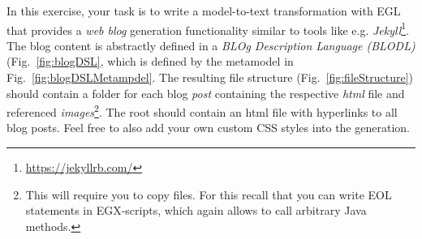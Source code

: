 \documentclass{article}
\begin{document}
	In this exercise, your task is to write a model-to-text transformation with EGL that provides a \emph{web blog} generation functionality similar to tools like e.g. \emph{Jekyll}\footnote{\url{https://jekyllrb.com/}}.
	The blog content is abstractly defined in a \emph{BLOg Description Language (BLODL)} (Fig.~\ref{fig:blogDSL}, which is defined by the metamodel in Fig.~\ref{fig:blogDSLMetampdel}.
	The resulting file structure (Fig.~\ref{fig:fileStructure}) should contain a folder for each blog \emph{post} containing the respective \emph{html} file and referenced \emph{images}\footnote{This will require you to copy files. For this recall that you can write EOL statements in EGX-scripts, which again allows to call arbitrary Java methods.}.
	The root should contain an html file with hyperlinks to all blog posts.
	Feel free to also add your own custom CSS styles into the generation.
	
\end{document}
